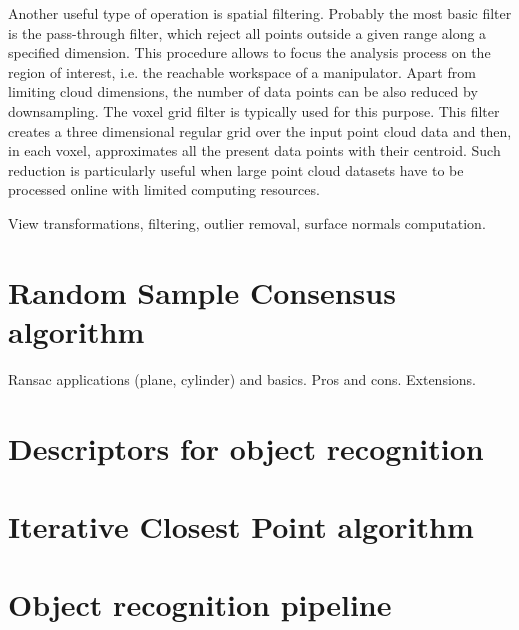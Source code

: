 Another useful type of operation is spatial filtering. Probably the most basic filter is the pass-through filter, which reject all points outside a given range along a specified dimension. This procedure allows to focus the analysis process on the region of interest, i.e. the reachable workspace of a manipulator. Apart from limiting cloud dimensions, the number of data points can be also reduced by downsampling. The voxel grid filter is typically used for this purpose. This filter creates a three dimensional regular grid over the input point cloud data and then, in each voxel, approximates all the present data points with their centroid. Such reduction is particularly useful when large point cloud datasets have to be processed online with limited computing resources.

View transformations, filtering, outlier removal, surface normals computation.


\section{Random Sample Consensus algorithm}
\label{sec:ransac}

Ransac applications (plane, cylinder) and basics. Pros and cons. Extensions. 


\section{Descriptors for object recognition}
\label{sec:descriptors}



\section{Iterative Closest Point algorithm}
\label{sec:icp}


\section{Object recognition pipeline}
\label{sec:pipeline}

